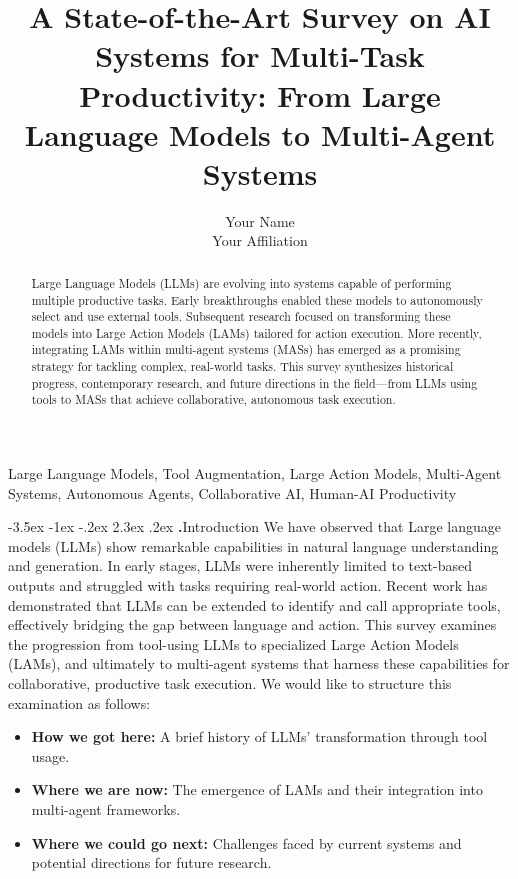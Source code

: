 \documentclass[journal,twoside,10pt]{IEEEtran}
\makeatletter
\renewcommand\section{\@startsection{section}{1}{\z@}%
                       {-3.5ex \@plus -1ex \@minus -.2ex}%
                       {2.3ex \@plus.2ex}%
                       {\normalfont\Large\bfseries\Roman{section}.\quad}}
\makeatother
\begin{document}
\title{A State-of-the-Art Survey on AI Systems for Multi-Task Productivity: From Large Language Models to Multi-Agent Systems}

\author{Your Name \\ Your Affiliation}

\maketitle

\begin{abstract}
    Large Language Models (LLMs) are evolving into systems capable of performing multiple productive tasks. 
    Early breakthroughs enabled these models to autonomously select and use external tools. 
    Subsequent research focused on transforming these models into Large Action Models (LAMs) tailored for action execution. 
    More recently, integrating LAMs within multi-agent systems (MASs) has emerged as a promising strategy for tackling complex, real-world tasks. 
    This survey synthesizes historical progress, contemporary research, and future directions in the field—from LLMs using tools to MASs that achieve collaborative, autonomous task execution.
\end{abstract}

\begin{IEEEkeywords}
    Large Language Models, Tool Augmentation, Large Action Models, Multi-Agent Systems, Autonomous Agents, Collaborative AI, Human-AI Productivity
\end{IEEEkeywords}

\section{Introduction}
We have observed that Large language models (LLMs) show remarkable capabilities in natural language understanding and generation. 
In early stages, LLMs were inherently limited to text-based outputs and struggled with tasks requiring real-world action. 
Recent work has demonstrated that LLMs can be extended to identify and call appropriate tools, effectively bridging the gap between language and action. 
This survey examines the progression from tool-using LLMs to specialized Large Action Models (LAMs), and ultimately to multi-agent systems that harness these capabilities for collaborative, productive task execution.
We would like to structure this examination as follows:
\begin{itemize}
    \item \textbf{How we got here:} A brief history of LLMs' transformation through tool usage.
    \item \textbf{Where we are now:} The emergence of LAMs and their integration into multi-agent frameworks.
    \item \textbf{Where we could go next:} Challenges faced by current systems and potential directions for future research.
\end{itemize}
\end{document}
